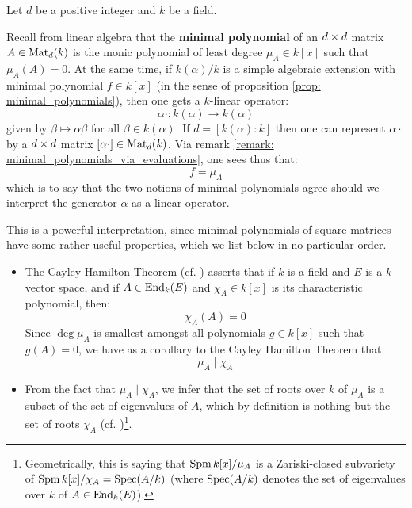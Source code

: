         \begin{remark}
            Let $d$ be a positive integer and $k$ be a field.
            
            Recall from linear algebra that the \textbf{minimal polynomial} of an $d \x d$ matrix $A \in \mathrm{Mat}_d(k)$ is the monic polynomial of least degree $\mu_A \in k[x]$ such that $\mu_A(A) = 0$. At the same time, if $k(\alpha)/k$ is a simple algebraic extension with minimal polynomial $f \in k[x]$ (in the sense of proposition \ref{prop: minimal_polynomials}), then one gets a $k$-linear operator:
                $$\alpha \cdot: k(\alpha) \to k(\alpha)$$
            given by $\beta \mapsto \alpha \beta$ for all $\beta \in k(\alpha)$. If $d = [k(\alpha) : k]$ then one can represent $\alpha \cdot$ by a $d \x d$ matrix $[\alpha \cdot] \in \mathrm{Mat}_d(k)$. Via remark \ref{remark: minimal_polynomials_via_evaluations}, one sees thus that:
                $$f = \mu_A$$
            which is to say that the two notions of minimal polynomials agree should we interpret the generator $\alpha$ as a linear operator.

            This is a powerful interpretation, since minimal polynomials of square matrices have some rather useful properties, which we list below in no particular order.
            \begin{itemize}
                \item The Cayley-Hamilton Theorem (cf. \cite[Theorem V.6.11]{aluffi_chapter_0}) asserts that if $k$ is a field and $E$ is a $k$-vector space, and if $A \in \mathrm{End}_k(E)$ and $\chi_A \in k[x]$ is its characteristic polynomial, then:
                    $$\chi_A(A) = 0$$
                Since $\deg \mu_A$ is smallest amongst all polynomials $g \in k[x]$ such that $g(A) = 0$, we have as a corollary to the Cayley Hamilton Theorem that:
                    $$\mu_A \mid \chi_A$$
                \item From the fact that $\mu_A \mid \chi_A$, we infer that the set of roots over $k$ of $\mu_A$ is a subset of the set of eigenvalues of $A$, which by definition is nothing but the set of roots $\chi_A$ (cf. \cite[Lemma V.6.14]{aluffi_chapter_0})\footnote{Geometrically, this is saying that $\operatorname{Spm} k[x]/\mu_A$ is a Zariski-closed subvariety of $\operatorname{Spm} k[x]/\chi_A = \operatorname{Spec}(A/k)$ (where $\operatorname{Spec}(A/k)$ denotes the set of eigenvalues over $k$ of $A \in \mathrm{End}_k(E)$).}.
                

\end{itemize}
\end{remark}
